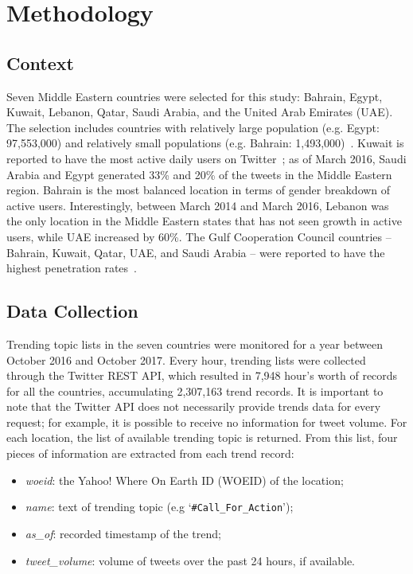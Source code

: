 \documentclass{llncs}
\begin{document}
\section{Methodology}\label{method}

\subsection{Context}

Seven Middle Eastern countries were selected for this study: Bahrain,
Egypt, Kuwait, Lebanon, Qatar, Saudi Arabia, and the United Arab
Emirates (UAE). The selection includes countries with relatively large
population (e.g. Egypt: 97,553,000) and relatively small populations
(e.g. Bahrain:
1,493,000)~\cite{UnitedNationsDepartmentofEconomicandSocialAffairs2017}.
Kuwait is reported to have the most active daily users on
Twitter~\cite{Salem2017}; as of March 2016, Saudi Arabia and Egypt
generated 33\% and 20\% of the tweets in the Middle Eastern
region. Bahrain is the most balanced location in terms of gender
breakdown of active users. Interestingly, between March 2014 and March
2016, Lebanon was the only location in the Middle Eastern states that
has not seen growth in active users, while UAE increased by 60\%. The
Gulf Cooperation Council countries -- Bahrain, Kuwait, Qatar, UAE, and
Saudi Arabia -- were reported to have the highest penetration
rates~\cite{Salem2017}.

\subsection{Data Collection}

Trending topic lists in the seven countries were monitored for a year
between October 2016 and October 2017. Every hour, trending lists were
collected through the Twitter REST API, which resulted in 7,948 hour's
worth of records for all the countries, accumulating 2,307,163 trend
records. It is important to note that the Twitter API does not
necessarily provide trends data for every request; for example, it is
possible to receive no information for tweet volume. For each
location, the list of available trending topic is returned. From this
list, four pieces of information are extracted from each trend record:

\begin{itemize}
\item {\emph{woeid}}: the Yahoo! Where On Earth ID (WOEID) of the location;
\item {\emph{name}}: text of trending topic (e.g `{\texttt{\#Call\_For\_Action}}');
\item {\emph{as\_of}}: recorded timestamp of the trend;
\item {\emph{tweet\_volume}}: volume of tweets over the past 24 hours, if available.
\end{itemize}
\end{document}
